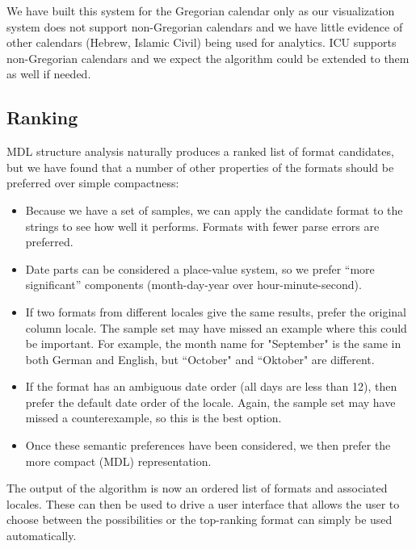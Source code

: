 We have built this system for the Gregorian calendar only as our visualization system does not support non-Gregorian calendars and we have little evidence of other calendars (\eg Hebrew, Islamic Civil) being used for analytics. ICU supports non-Gregorian calendars and we expect the algorithm could be extended to them as well if needed.

\subsection{Ranking}
MDL structure analysis naturally produces a ranked list of format candidates, but we have found that a number of other properties of the formats should be preferred over simple compactness:
\begin{itemize}
\item Because we have a set of samples, we can apply the candidate format to the strings to see how well it performs. Formats with fewer parse errors are preferred.
\item Date parts can be considered a place-value system, so we prefer ``more significant'' components (\eg month-day-year over hour-minute-second).
\item If two formats from different locales give the same results, prefer the original column locale. The sample set may have missed an example where this could be important. For example, the month name for "September" is the same in both German and English, but ``October" and ``Oktober" are different.
\item If the format has an ambiguous date order (\eg all days are less than 12), then prefer the default date order of the locale. Again, the sample set may have missed a counterexample, so this is the best option.
\item Once these semantic preferences have been considered, we then prefer the more compact (MDL) representation.
\end{itemize}

The output of the algorithm is now an ordered list of formats and associated locales. These can then be used to drive a user interface that allows the user to choose between the possibilities or the top-ranking format can simply be used automatically.
